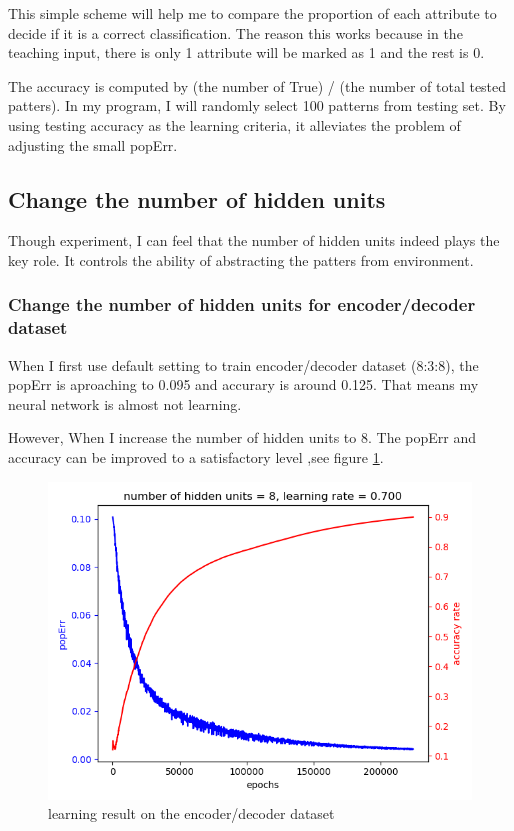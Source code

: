 \documentclass[11pt]{article}
\begin{document}
This simple scheme will help me to compare the proportion of each attribute to decide if it is a correct classification. The reason this works because in the teaching input, there is only 1 attribute will be marked as 1 and the rest is 0.

The accuracy is computed by (the number of True) / (the number of total tested patters). In my program, I will randomly select 100 patterns from testing set. By using testing accuracy as the learning criteria, it alleviates the problem of adjusting the small popErr.

\subsection{Change the number of hidden units}
\label{sec-3-2}
Though experiment, I can feel that the number of hidden units indeed plays the key role. It controls the ability of abstracting the patters from environment.
\subsubsection{Change the number of hidden units for encoder/decoder dataset}
\label{sec-3-2-1}
When I first use default setting to train encoder/decoder dataset (8:3:8), the popErr is aproaching to 0.095 and accurary is around 0.125. That means my neural network is almost not learning.

However, When I increase the number of hidden units to 8. The popErr and accuracy can be improved to a satisfactory level ,see figure \ref{fig-coder-8hidden}.

\begin{figure}[htb]
\centering
\includegraphics[width=.9\linewidth]{./popErr_vs_accuracy_on_coder.png}
\caption{learning result on the encoder/decoder dataset \label{fig-coder-8hidden}}
\end{figure}
\end{document}
